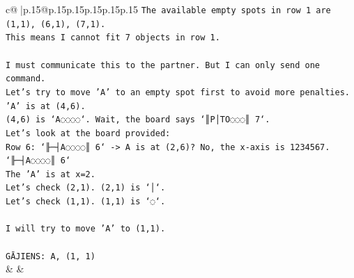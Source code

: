\documentclass{article}
\begin{document}
{\begin{supertabular}{c@{$\;$}|p{.15\linewidth}@{}p{.15\linewidth}p{.15\linewidth}p{.15\linewidth}p{.15\linewidth}p{.15\linewidth}}
{{{\texttt{The available empty spots in row 1 are (1,1), (6,1), (7,1).} \\
\texttt{This means I cannot fit 7 objects in row 1.} \\
\\ 
\texttt{I must communicate this to the partner. But I can only send one command.} \\
\texttt{Let's try to move 'A' to an empty spot first to avoid more penalties.} \\
\texttt{'A' is at (4,6).} \\
\texttt{(4,6) is `A◌◌◌◌`. Wait, the board says `║P│TO◌◌◌║ 7`.} \\
\texttt{Let's look at the board provided:} \\
\texttt{Row 6: `╟─┤A◌◌◌◌║ 6` {-}> A is at (2,6)? No, the x{-}axis is 1234567.} \\
\texttt{`╟─┤A◌◌◌◌║ 6`} \\
\texttt{The 'A' is at x=2.} \\
\texttt{Let's check (2,1). (2,1) is `│`.} \\
\texttt{Let's check (1,1). (1,1) is `◌`.} \\
\\ 
\texttt{I will try to move 'A' to (1,1).} \\
\\ 
\texttt{GĀJIENS: A, (1, 1)} \\
            }
        }
    }
    & & \\ \\


\end{supertabular}}
\end{document}

